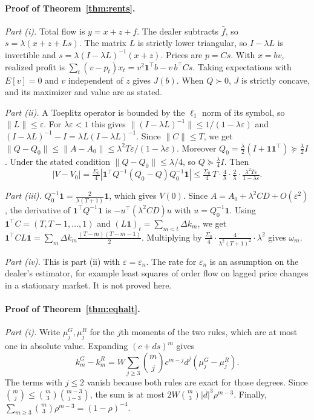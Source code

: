 \documentclass[12pt]{article}
\theoremstyle{definition}
\theoremstyle{remark}
\begin{document}
\paragraph{Proof of Theorem~\ref{thm:rents}.}
\emph{Part (i).} Total flow is $y=x+z+f$. The dealer subtracts $\hat f$, so $s=\lambda(x+z+Ls)$. The matrix $L$ is strictly lower triangular, so $I-\lambda L$ is invertible and $s=\lambda(I-\lambda L)^{-1}(x+z)$. Prices are $p=Cs$. With $x=bv$, realized profit is $\sum_t(v-p_t)x_t=v^2\mathbf1^\top b-v\,b^\top Cs$. Taking expectations with $E[v]=0$ and $v$ independent of $z$ gives $J(b)$. When $Q\succ0$, $J$ is strictly concave, and its maximizer and value are as stated.

\emph{Part (ii).} A Toeplitz operator is bounded by the $\ell_1$ norm of its symbol, so $\|L\|\le\varepsilon$. For $\lambda\varepsilon<1$ this gives $\|(I-\lambda L)^{-1}\|\le1/(1-\lambda\varepsilon)$ and $(I-\lambda L)^{-1}-I=\lambda L(I-\lambda L)^{-1}$. Since $\|C\|\le T$, we get $\|Q-Q_0\|\le\|A-A_0\|\le\lambda^2T\varepsilon/(1-\lambda\varepsilon)$. Moreover $Q_0=\tfrac\lambda2(I+\mathbf1\mathbf1^\top)\succeq\tfrac\lambda2I$. Under the stated condition $\|Q-Q_0\|\le\lambda/4$, so $Q\succeq\tfrac\lambda4I$. Then
\[
|V-V_0|=\tfrac{\Sigma_0}4|\mathbf1^\top Q^{-1}(Q_0-Q)Q_0^{-1}\mathbf1|\le\tfrac{\Sigma_0}4\,T\cdot\tfrac4\lambda\cdot\tfrac2\lambda\cdot\tfrac{\lambda^2T\varepsilon}{1-\lambda\varepsilon}.
\]

\emph{Part (iii).} $Q_0^{-1}\mathbf1=\frac{2}{\lambda(T+1)}\mathbf1$, which gives $V(0)$. Since $A=A_0+\lambda^2CD+O(\varepsilon^2)$, the derivative of $\mathbf1^\top Q^{-1}\mathbf1$ is $-u^\top(\lambda^2CD)u$ with $u=Q_0^{-1}\mathbf1$. Using $\mathbf1^\top C=(T,T-1,\ldots,1)$ and $(L\mathbf1)_t=\sum_{m<t}\Delta k_m$, we get $\mathbf1^\top CL\mathbf1=\sum_m\Delta k_m\frac{(T-m)(T-m-1)}2$. Multiplying by $\tfrac{\Sigma_0}4\cdot\frac{4}{\lambda^2(T+1)^2}\cdot\lambda^2$ gives $\omega_m$.

\emph{Part (iv).} This is part (ii) with $\varepsilon=\varepsilon_n$. The rate for $\varepsilon_n$ is an assumption on the dealer's estimator, for example least squares of order flow on lagged price changes in a stationary market. It is not proved here.

\paragraph{Proof of Theorem~\ref{thm:eqhalt}.}
\emph{Part (i).} Write $\mu_j^G,\mu_j^R$ for the $j$th moments of the two rules, which are at most one in absolute value. Expanding $(c+ds)^m$ gives
\[
k_m^G-k_m^R=W\sum_{j\ge3}\binom mj c^{m-j}d^j(\mu_j^G-\mu_j^R).
\]
The terms with $j\le2$ vanish because both rules are exact for those degrees. Since $\binom mj\le\binom m3\binom{m-3}{j-3}$, the sum is at most $2W\binom m3|d|^3\rho^{m-3}$. Finally, $\sum_{m\ge3}\binom m3\rho^{m-3}=(1-\rho)^{-4}$.
\end{document}
